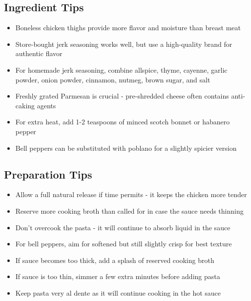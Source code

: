 \documentclass[11pt,letterpaper]{article}
\begin{document}
{\begin{multicols}{2}
\subsection*{Ingredient Tips}
\begin{itemize}
    \item Boneless chicken thighs provide more flavor and moisture than breast meat
    \item Store-bought jerk seasoning works well, but use a high-quality brand for authentic flavor
    \item For homemade jerk seasoning, combine allspice, thyme, cayenne, garlic powder, onion powder, cinnamon, nutmeg, brown sugar, and salt
    \item Freshly grated Parmesan is crucial - pre-shredded cheese often contains anti-caking agents
    \item For extra heat, add 1-2 teaspoons of minced scotch bonnet or habanero pepper
    \item Bell peppers can be substituted with poblano for a slightly spicier version
\end{itemize}

\subsection*{Preparation Tips}
\begin{itemize}
    \item Allow a full natural release if time permits - it keeps the chicken more tender
    \item Reserve more cooking broth than called for in case the sauce needs thinning
    \item Don't overcook the pasta - it will continue to absorb liquid in the sauce
    \item For bell peppers, aim for softened but still slightly crisp for best texture
    \item If sauce becomes too thick, add a splash of reserved cooking broth
    \item If sauce is too thin, simmer a few extra minutes before adding pasta
    \item Keep pasta very al dente as it will continue cooking in the hot sauce
\end{itemize}


\end{multicols}}
\end{document}
